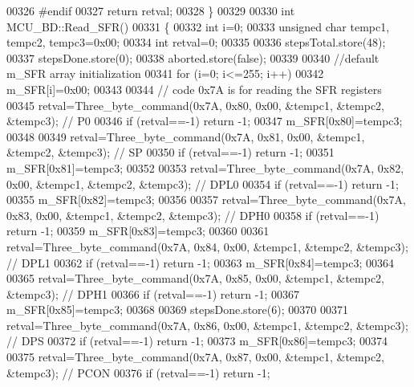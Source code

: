 \begin{DoxyCode}
{{00326 \textcolor{preprocessor}{#endif}
00327     \textcolor{keywordflow}{return} retval;
00328 \}
00329 
00330 \textcolor{keywordtype}{int} MCU\_BD::Read\_SFR()
00331 \{
00332     \textcolor{keywordtype}{int} i=0;
00333     \textcolor{keywordtype}{unsigned} \textcolor{keywordtype}{char} tempc1, tempc2, tempc3=0x00;
00334     \textcolor{keywordtype}{int} retval=0;
00335 
00336     stepsTotal.store(48);
00337     stepsDone.store(0);
00338     aborted.store(\textcolor{keyword}{false});
00339 
00340     \textcolor{comment}{//default m\_SFR array initialization}
00341     \textcolor{keywordflow}{for} (i=0; i<=255; i++)
00342             m\_SFR[i]=0x00;
00343 
00344     \textcolor{comment}{// code 0x7A is for reading the SFR registers}
00345     retval=Three\_byte\_command(0x7A, 0x80, 0x00, &tempc1, &tempc2, &tempc3); \textcolor{comment}{// P0}
00346     \textcolor{keywordflow}{if} (retval==-1) \textcolor{keywordflow}{return} -1;
00347     m\_SFR[0x80]=tempc3;
00348 
00349     retval=Three\_byte\_command(0x7A, 0x81, 0x00, &tempc1, &tempc2, &tempc3); \textcolor{comment}{// SP}
00350     \textcolor{keywordflow}{if} (retval==-1) \textcolor{keywordflow}{return} -1;
00351     m\_SFR[0x81]=tempc3;
00352 
00353     retval=Three\_byte\_command(0x7A, 0x82, 0x00, &tempc1, &tempc2, &tempc3); \textcolor{comment}{// DPL0}
00354     \textcolor{keywordflow}{if} (retval==-1) \textcolor{keywordflow}{return} -1;
00355     m\_SFR[0x82]=tempc3;
00356 
00357     retval=Three\_byte\_command(0x7A, 0x83, 0x00, &tempc1, &tempc2, &tempc3); \textcolor{comment}{// DPH0}
00358     \textcolor{keywordflow}{if} (retval==-1) \textcolor{keywordflow}{return} -1;
00359     m\_SFR[0x83]=tempc3;
00360 
00361     retval=Three\_byte\_command(0x7A, 0x84, 0x00, &tempc1, &tempc2, &tempc3); \textcolor{comment}{// DPL1}
00362     \textcolor{keywordflow}{if} (retval==-1) \textcolor{keywordflow}{return} -1;
00363     m\_SFR[0x84]=tempc3;
00364 
00365     retval=Three\_byte\_command(0x7A, 0x85, 0x00, &tempc1, &tempc2, &tempc3); \textcolor{comment}{// DPH1}
00366     \textcolor{keywordflow}{if} (retval==-1) \textcolor{keywordflow}{return} -1;
00367     m\_SFR[0x85]=tempc3;
00368 
00369     stepsDone.store(6);
00370 
00371     retval=Three\_byte\_command(0x7A, 0x86, 0x00, &tempc1, &tempc2, &tempc3); \textcolor{comment}{// DPS}
00372     \textcolor{keywordflow}{if} (retval==-1) \textcolor{keywordflow}{return} -1;
00373     m\_SFR[0x86]=tempc3;
00374 
00375     retval=Three\_byte\_command(0x7A, 0x87, 0x00, &tempc1, &tempc2, &tempc3); \textcolor{comment}{// PCON}
00376     \textcolor{keywordflow}{if} (retval==-1) \textcolor{keywordflow}{return} -1;
}}
\end{DoxyCode}
